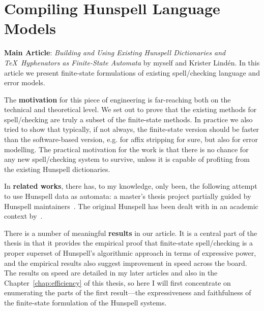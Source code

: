 \documentclass[officiallayout]{unihelcompling}
\begin{document}
\section{Compiling Hunspell Language Models}
\label{sec:Hunspell}

\textbf{Main Article}: \emph{Building and Using Existing Hunspell Dictionaries
and \TeX\ Hyphenators as Finite-State Automata} by myself and Krister Lindén.
In this article we present finite-state formulations of existing spell\-/checking
language and error models.

The \textbf{motivation} for this piece of engineering is far-reaching both on
the technical and theoretical level. We set out to prove that the existing
methods for spell\-/checking are truly a subset of the finite-state methods.
In practice we also tried to show that typically, if not always, the
finite-state version should be faster than the software-based version, e.g. for
affix stripping for sure, but also for error modelling. The practical
motivation for the work is that there is no chance for any new spell\-/checking
system to survive, unless it is capable of profiting from the existing Hunspell
dictionaries.

In \textbf{related works}, there has, to my knowledge, only been, the following
attempt to use Hunspell data as automata: a master's thesis project partially
guided by Hunspell maintainers~\citep{greenfield2010open}.
The
original Hunspell has been dealt with in an academic context 
by~\citet{tron2005hunmorph}.

There is a number of meaningful \textbf{results} in our article. It
is a central part of the thesis in that it provides the empirical proof that
finite-state spell\-/checking is a proper superset of Hunspell's algorithmic 
approach in terms of expressive power, and the empirical results also suggest
improvement in speed across the board. The results on speed are detailed in my
later articles and also in the Chapter~\ref{chap:efficiency} of this thesis,
so here I will first concentrate on enumerating the parts of the first
result---the expressiveness and faithfulness of the finite-state formulation of
the Hunspell systems.
\end{document}

